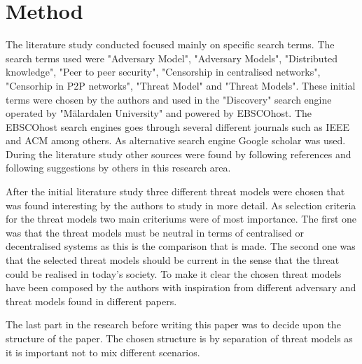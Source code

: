 \section{Method}
The literature study conducted focused mainly on specific search terms. The search terms used were "Adversary Model", "Adversary Models", "Distributed knowledge", "Peer to peer security", "Censorship in centralised networks", "Censorhip in P2P networks", "Threat Model" and "Threat Models".
These initial terms were chosen by the authors and used in the "Discovery" search engine operated by "M\"{a}lardalen University" and powered by EBSCOhost.
The EBSCOhost search engines goes through several different journals such as IEEE and ACM among others.
As alternative search engine Google scholar was used.
During the literature study other sources were found by following references and following suggestions by others in this research area.

After the initial literature study three different threat models were chosen that was found interesting by the authors to study in more detail.
As selection criteria for the threat models two main criteriums were of most importance. 
The first one was that the threat models must be neutral in terms of centralised or decentralised systems as this is the comparison that is made.
The second one was that the selected threat models should be current in the sense that the threat could be realised in today's society.
To make it clear the chosen threat models have been composed by the authors with inspiration from different adversary and threat models found in different papers.

The last part in the research before writing this paper was to decide upon the structure of the paper. The chosen structure is by separation of threat models as it is important not to mix different scenarios.

